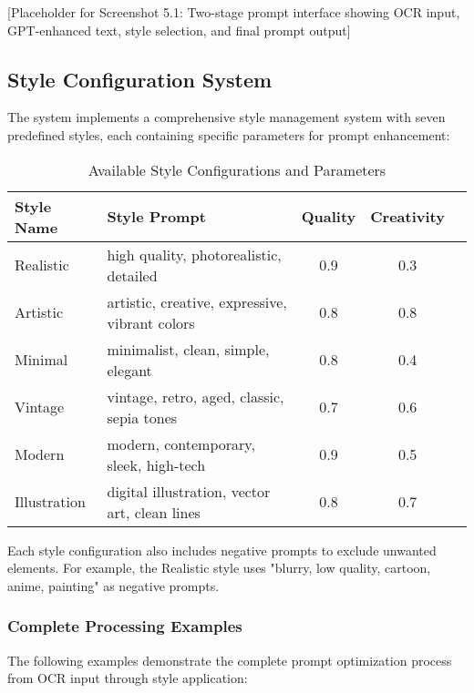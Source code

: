 [Placeholder for Screenshot 5.1: Two-stage prompt interface showing OCR input, GPT-enhanced text, style selection, and final prompt output]

\subsection{Style Configuration System}

The system implements a comprehensive style management system with seven predefined styles, each containing specific parameters for prompt enhancement:

\begin{table}[H]
\centering
\caption{Available Style Configurations and Parameters}
\label{tab:style_configurations}
{\begin{tabular}{llccc}
\toprule
\textbf{Style Name} & \textbf{Style Prompt} & \textbf{Quality} & \textbf{Creativity} \\
\midrule
Realistic & high quality, photorealistic, detailed & 0.9 & 0.3 \\
Artistic & artistic, creative, expressive, vibrant colors & 0.8 & 0.8 \\
Minimal & minimalist, clean, simple, elegant & 0.8 & 0.4  \\
Vintage & vintage, retro, aged, classic, sepia tones & 0.7 & 0.6  \\
Modern & modern, contemporary, sleek, high-tech & 0.9 & 0.5  \\
Illustration & digital illustration, vector art, clean lines & 0.8 & 0.7  \\
\bottomrule
\end{tabular}}
\end{table}

Each style configuration also includes negative prompts to exclude unwanted elements. For example, the Realistic style uses "blurry, low quality, cartoon, anime, painting" as negative prompts.

\subsubsection{Complete Processing Examples}

The following examples demonstrate the complete prompt optimization process from OCR input through style application:

